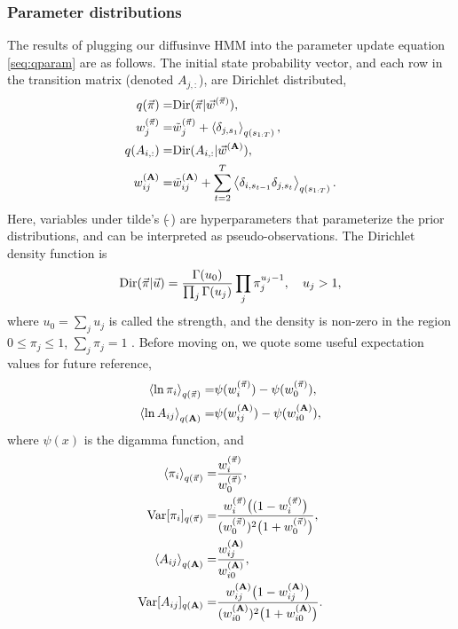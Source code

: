 \subsubsection{Parameter distributions}
The results of plugging our diffusinve HMM into the parameter update
equation \eqref{seq:qparam} are as follows.  The initial state
probability vector, and each row in the transition matrix (denoted
$A_{j,:}$), are Dirichlet distributed,
\begin{align}
q(\vec{\pi})=&\text{Dir}(\vec{\pi}|\vec{w}^{(\vec{\pi})}),\label{seq:VBpi}\\
w_j^{(\vec{\pi})}=&\tilde w_j^{(\vec{\pi})}+\left\langle \delta_{j,s_1}\right\rangle_{q(s_{1:T})},
\label{seq:VBMpi}\\
q(A_{i,:})=&\text{Dir}(A_{i,:}|\vec{w}^{(\mathbf{A})}),\\
w_{ij}^{(\mathbf{A})}=&\tilde w_{ij}^{(\mathbf{A})}
+\sum_{t=2}^T\left\langle \delta_{i,s_{t-1}}\delta_{j,s_t}\right\rangle_{q(s_{1:T})}.\label{seq:VBMAj}
\end{align}
Here, variables under tilde's ($\tilde{~}$) are hyperparameters that
parameterize the prior distributions, and can be interpreted as
pseudo-observations. The Dirichlet density function is
\begin{equation}
  \text{Dir}(\vec \pi | \vec u)=\frac{\Gamma(u_0)}{\prod_j\Gamma(u_j)}
  \prod_j \pi_j^{u_j-1},\quad u_j>1,
\end{equation}
where $u_0=\sum_j u_j$ is called the strength, and the density is
non-zero in the region $0\le\pi_j\le1$, $\sum_j\pi_j=1$ . Before
moving on, we quote some useful expectation values for future
reference,
\begin{align}
  \left\langle \ln\pi_i\right\rangle_{q(\vec{\pi})}=&\psi(w_i^{(\vec{\pi})})-\psi(w_0^{(\vec{\pi})}),
  \label{seq:mlogpi}\\
  \left\langle \ln A_{ij}\right\rangle_{q(\mathbf{A})}=&\psi(w_{ij}^{(\mathbf{A})})
  -\psi(w_{i0}^{(\mathbf{A})}),\label{seq:mlogA}
\end{align}
where $\psi(x)$ is the digamma function, and
\begin{align}
  \left\langle \pi_i\right\rangle_{q(\vec{\pi})}=&\frac{w_i^{(\vec{\pi})}}{w_0^{(\vec{\pi})}},\\
  \text{Var}[\pi_i]_{q(\vec{\pi})}=&
  \frac{w_i^{(\vec{\pi})}\big((1-w_i^{(\vec{\pi})}\big)}{
    (w_0^{(\vec{\pi})})^2\big(1+w_0^{(\vec{\pi})}\big)},\\
  \left\langle A_{ij}\right\rangle_{q(\mathbf{A})}=&\frac{w_{ij}^{(\mathbf{A})}}{w_{i0}^{(\mathbf{A})}},\\
  \text{Var}[A_{ij}]_{q(\mathbf{A})}=&
  \frac{w_{ij}^{(\mathbf{A})}\big(1-w_{ij}^{(\mathbf{A})}\big)}{
    (w_{i0}^{(\mathbf{A})})^2\big(1+w_{i0}^{(\mathbf{A})}\big)}.
\end{align}
